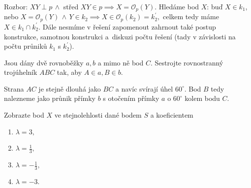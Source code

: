 \begin{reseni}
Rozbor: $XY\perp p \, \land$ střed $XY\in p \implies X=\mathcal O_p(Y)$. Hledáme
bod $X$: buď $X \in k_1$, nebo $X=\mathcal O_p(Y) \, \land \, Y \in k_2 \implies X \in \mathcal O_p(k_2)=k_2^\prime,$ celkem
tedy máme $X\in k_1\cap k_2^\prime.$ Dále nesmíme v řešení zapomenout zahrnout také postup
konstrukce, samotnou konstrukci a~diskuzi počtu řešení (tady v závislosti na
počtu průniků $k_1$ s $k_2^\prime$).
\end{reseni}

\begin{priklad}
Jsou dány dvě rovnoběžky $a,b$ a mimo ně bod $C$. Sestrojte rovnostranný
trojúhelník $ABC$ tak, aby $A \in a, B \in b$.
\end{priklad}

\begin{reseni}
Strana $AC$ je stejně dlouhá jako $BC$ a navíc svírají úhel $60^\circ$. Bod
$B$ tedy nalezneme jako průnik přímky $b$ s otočením přímky $a$ o $60^\circ$ kolem
bodu $C.$
\end{reseni}

\begin{priklad}\label{prlambda}
Zobrazte bod $X$ ve stejnolehlosti dané bodem $S$ a koeficientem
\begin{enumerate}[$i.$]
\item $\lambda = 3,$
\item $\lambda = \frac{1}{3},$
\item $\lambda = -\frac{1}{3},$
\item $\lambda = -3.$
\end{enumerate}
\end{priklad}

